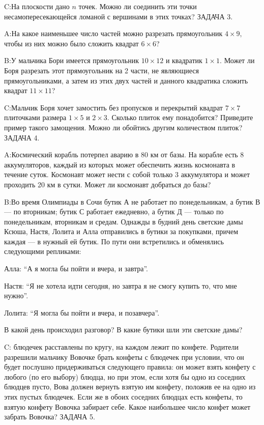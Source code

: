\documentclass[10pt]{scrbook} \usepackage{modules/nonstahp_book}
\begin{document}
C:\qquad На плоскости дано $n$ точек. Можно ли соединить эти точки несамопересекающейся ломаной с вершинами в этих точках?
\medbreak
\noindent
ЗАДАЧА 3.

A:\qquad На какое наименьшее число частей можно разрезать прямоугольник $4\times 9,$ чтобы из них можно было сложить квадрат $6\times 6$?

B:\qquad У мальчика Бори имеется прямоугольник $10\times 12$ и квадратик $1\times 1.$ Может ли Боря разрезать этот прямоугольник на 2 части, не являющиеся прямоугольниками, а затем из этих двух частей и данного квадратика сложить квадрат $11\times 11$?

C:\qquad Мальчик Боря хочет замостить без пропусков и перекрытий квадрат $7\times 7$ плиточками размера $1\times 5$ и $2\times 3.$ Сколько плиток ему понадобится? Приведите пример такого замощения.  Можно ли обойтись другим количеством плиток?
\medbreak
\noindent
ЗАДАЧА 4. 

A:\qquad Космический корабль потерпел аварию в 80 км от базы. На корабле есть 8 аккумуляторов, каждый из которых может обеспечить жизнь космонавта в течение суток. Космонавт может нести с собой только 3 аккумулятора и может проходить 20 км в сутки. Может ли космонавт добраться до базы?

B:\qquad Во время Олимпиады в Сочи бутик А не работает по понедельникам, а бутик В --- по вторникам; бутик С работает ежедневно, а бутик Д --- только по понедельникам, вторникам и средам. Однажды в будний день светские дамы  Ксюша, Настя, Лолита и Алла отправились в бутики за покупками, причем каждая --- в нужный ей бутик. По пути они встретились и обменялись следующими репликами:

Алла: ``А я могла бы пойти и вчера, и завтра''.\par
Настя: ``Я не хотела идти сегодня, но завтра я не смогу купить то, что мне нужно''.\par
Лолита: ``Я могла бы пойти и вчера, и позавчера''.

\noindent
В какой день происходил разговор? В какие бутики шли эти светские дамы?
 
C: блюдечек расставлены по кругу, на каждом лежит по конфете. Родители разрешили мальчику Вовочке брать конфеты с блюдечек при условии, что он будет послушно придерживаться следующего правила: он может взять конфету с любого (по его выбору) блюдца, но при этом, если хотя бы одно из соседних блюдцев пусто, Вова должен вернуть взятую им конфету, положив ее на одно из этих пустых блюдечек. Если же в обоих соседних блюдцах есть конфеты, то взятую конфету Вовочка забирает себе. Какое наибольшее число конфет может забрать Вовочка?
\medbreak
\noindent
ЗАДАЧА 5. 
\end{document}
